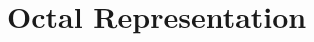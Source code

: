 \documentclass[../main.tex]{subfiles}
\begin{document}
    \section{Octal Representation}
\end{document}

